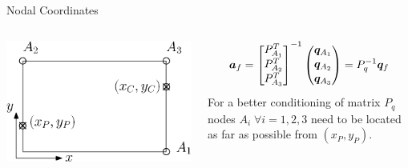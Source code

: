 \documentclass{beamer}
\begin{document}
\begin{frame}{Nodal Coordinates}
\begin{columns}
	\begin{column}{0.5\textwidth}
	\centering
	\includegraphics[width=0.8\columnwidth]{Kirchh_elem.eps}	
	\end{column}
	\begin{column}{0.5\textwidth}
		\begin{equation*}
			\bm{a}_f =
			\begin{bmatrix}
			P_{A_1}^T \vspace{1pt}\\
			P_{A_2}^T \vspace{1pt}\\
			P_{A_3}^T \vspace{1pt}\\
			\end{bmatrix}^{-1}
			\begin{pmatrix}
			\bm{q}_{A_1} \vspace{1pt}\\
			\bm{q}_{A_2} \vspace{1pt}\\
			\bm{q}_{A_3} \vspace{1pt}\\
			\end{pmatrix} = P_q^{-1} \bm{q}_f
		\end{equation*}
For a better conditioning of matrix $P_q$ nodes $A_i \; \forall i = 1,2,3$ need to be located as far as possible from $(x_P, y_P)$.
	\end{column}
\end{columns}

\end{frame}
\end{document}
